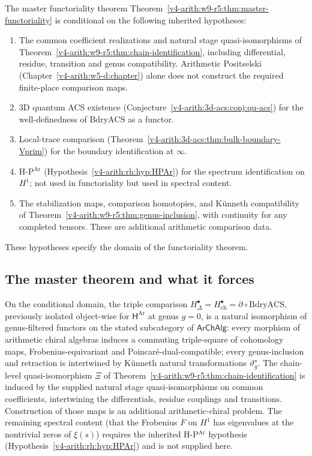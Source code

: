 The master functoriality theorem
Theorem~\ref{v4-arith:w9-r5:thm:master-functoriality} is conditional on
the following inherited hypotheses:
\begin{enumerate}
\item The common coefficient realizations and natural stage
quasi-isomorphisms of Theorem~\ref{v4-arith:w9-r5:thm:chain-identification},
including differential, residue, transition and genus compatibility.
Arithmetic Positselski (Chapter~\ref{v4-arith:w5-d:chapter}) alone
does not construct the required finite-place comparison maps.
\item 3D quantum ACS existence
(Conjecture~\ref{v4-arith:3d-acs:conj:qu-acs}) for the well-definedness of
\(\mathrm{BdryACS}\) as a functor.
\item Local-trace comparison
(Theorem~\ref{v4-arith:3d-acs:thm:bulk-boundary-Vprim}) for the boundary
identification at \(\infty\).
\item H-P\(^{\mathrm{Ar}}\)
(Hypothesis~\ref{v4-arith:rh:hyp:HPAr}) for the spectrum identification on
\(H^{1}\); not used in functoriality but used in spectral content.
\item The stabilization maps, comparison homotopies, and
K\"unneth compatibility of
Theorem~\ref{v4-arith:w9-r5:thm:genus-inclusion}, with continuity
for any completed tensors. These are additional arithmetic
comparison data.
\end{enumerate}
These hypotheses specify the domain of the functoriality theorem.

\subsection{The master theorem and what it forces}
\label{v4-arith:w9-r5:summary}

On the conditional domain, the triple comparison
\(H^{\bullet}_{\Delta}=H^{\bullet}_{\mathrm{ch}}=\partial\circ\mathrm{BdryACS}\),
previously isolated object-wise for \(\mathsf{H}^{\mathrm{Ar}}\)
at genus \(g=0\), is a natural isomorphism of genus-filtered functors
on the stated subcategory of \(\mathsf{ArChAlg}\): every morphism of arithmetic chiral
algebras induces a commuting triple-square of cohomology maps,
Frobenius-equivariant and Poincar\'e-dual-compatible; every
genus-inclusion and retraction is intertwined by K\"unneth
natural transformations \(\vartheta^{\star}_{g}\). The chain-level
quasi-isomorphism \(\Xi\) of
Theorem~\ref{v4-arith:w9-r5:thm:chain-identification} is induced by the
supplied natural stage quasi-isomorphisms on common coefficients,
intertwining the differentials, residue couplings and transitions.
Construction of those maps is an additional arithmetic-chiral problem.
The remaining spectral content (that the Frobenius \(F\) on \(H^{1}\)
has eigenvalues at the nontrivial zeros of \(\xi(s)\)) requires the
inherited H-P\(^{\mathrm{Ar}}\) hypothesis
(Hypothesis~\ref{v4-arith:rh:hyp:HPAr}) and is not supplied here.


